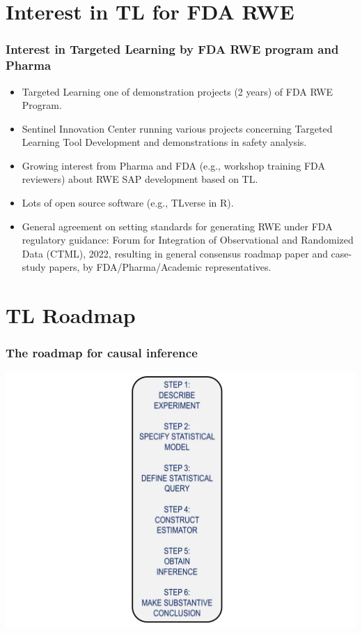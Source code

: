 \documentclass[t]{beamer}
\begin{document}
\section{Interest in TL for FDA RWE}
\begin{frame}\frametitle{Interest in Targeted Learning by FDA RWE program and Pharma}
\begin{itemize}
\item Targeted Learning one of demonstration projects (2 years) of FDA RWE Program.
\item Sentinel Innovation Center running various projects concerning Targeted Learning Tool Development and demonstrations in safety analysis. 
\item Growing interest from Pharma and FDA (e.g., workshop training FDA reviewers) about RWE SAP development based on TL. 
\item Lots of open source software (e.g., TLverse in R). 
\item General agreement on setting standards for generating RWE under FDA regulatory guidance: Forum for Integration of Observational and Randomized Data (CTML), 2022, resulting in general consensus roadmap paper and case-study papers, by FDA/Pharma/Academic representatives.
\end{itemize}
\end{frame}

\section{TL Roadmap}

\begin{frame}
  \frametitle{The roadmap for causal inference}
  \vspace{-20pt}
  \begin{center}
  \includegraphics[width = 1.05\textwidth]{figures/roadmap.pdf}
  \end{center}
\end{frame}
\end{document}
